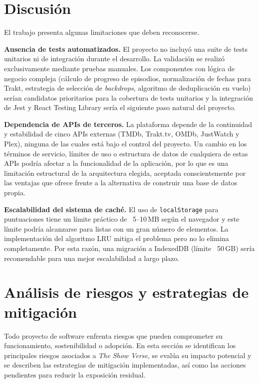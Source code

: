 \section{Discusión}

El trabajo presenta algunas limitaciones que deben reconocerse.

\textbf{Ausencia de tests automatizados.} El proyecto no incluyó una suite de tests unitarios ni de integración durante el desarrollo. La validación se realizó exclusivamente mediante pruebas manuales. Los componentes con lógica de negocio compleja (cálculo de progreso de episodios, normalización de fechas para Trakt, estrategia de selección de \textit{backdrops}, algoritmo de deduplicación en vuelo) serían candidatos prioritarios para la cobertura de tests unitarios y la integración de Jest y React Testing Library sería el siguiente paso natural del proyecto.

\textbf{Dependencia de APIs de terceros.} La plataforma depende de la continuidad y estabilidad de cinco APIs externas (TMDb, Trakt.tv, OMDb, JustWatch y Plex), ninguna de las cuales está bajo el control del proyecto. Un cambio en los términos de servicio, límites de uso o estructura de datos de cualquiera de estas APIs podría afectar a la funcionalidad de la aplicación, por lo que es una limitación estructural de la arquitectura elegida, aceptada conscientemente por las ventajas que ofrece frente a la alternativa de construir una base de datos propia.

\textbf{Escalabilidad del sistema de caché.} El uso de \texttt{localStorage} para puntuaciones tiene un límite práctico de ~5--10\,MB según el navegador y este límite podría alcanzarse para listas con un gran número de elementos. La implementación del algoritmo LRU mitiga el problema pero no lo elimina completamente. Por esta razón, una migración a IndexedDB \parencite{MDN:2024b} (límite ~50\,GB) sería recomendable para una mejor escalabilidad a largo plazo.

\section{Análisis de riesgos y estrategias de mitigación}

Todo proyecto de software enfrenta riesgos que pueden comprometer su funcionamiento, sostenibilidad o adopción. En esta sección se identifican los principales riesgos asociados a \textit{The Show Verse}, se evalúa su impacto potencial y se describen las estrategias de mitigación implementadas, así como las acciones pendientes para reducir la exposición residual.

